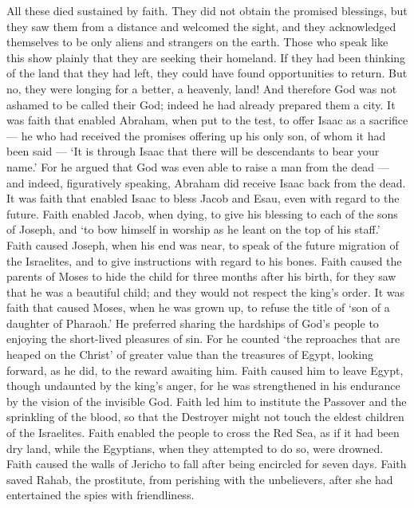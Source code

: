  All these died sustained by faith. They did not obtain the
promised blessings, but they saw them from a distance and welcomed the
sight, and they acknowledged themselves to be only aliens and strangers
on the earth.  Those who speak like this show plainly that
they are seeking their homeland.  If they had been thinking
of the land that they had left, they could have found opportunities to
return.  But no, they were longing for a better, a
heavenly, land! And therefore God was not ashamed to be called their
God; indeed he had already prepared them a city.  It was
faith that enabled Abraham, when put to the test, to offer Isaac as a
sacrifice --- he who had received the promises offering up his only son,
 of whom it had been said --- `It is through Isaac that
there will be descendants to bear your name.'  For he
argued that God was even able to raise a man from the dead --- and
indeed, figuratively speaking, Abraham did receive Isaac back from the
dead.  It was faith that enabled Isaac to bless Jacob and
Esau, even with regard to the future.  Faith enabled Jacob,
when dying, to give his blessing to each of the sons of Joseph, and `to
bow himself in worship as he leant on the top of his staff.'
 Faith caused Joseph, when his end was near, to speak of
the future migration of the Israelites, and to give instructions with
regard to his bones.  Faith caused the parents of Moses to
hide the child for three months after his birth, for they saw that he
was a beautiful child; and they would not respect the king's order.
 It was faith that caused Moses, when he was grown up, to
refuse the title of `son of a daughter of Pharaoh.'  He
preferred sharing the hardships of God's people to enjoying the
short-lived pleasures of sin.  For he counted `the
reproaches that are heaped on the Christ' of greater value than the
treasures of Egypt, looking forward, as he did, to the reward awaiting
him.  Faith caused him to leave Egypt, though undaunted by
the king's anger, for he was strengthened in his endurance by the vision
of the invisible God.  Faith led him to institute the
Passover and the sprinkling of the blood, so that the Destroyer might
not touch the eldest children of the Israelites.  Faith
enabled the people to cross the Red Sea, as if it had been dry land,
while the Egyptians, when they attempted to do so, were drowned.
 Faith caused the walls of Jericho to fall after being
encircled for seven days.  Faith saved Rahab, the
prostitute, from perishing with the unbelievers, after she had
entertained the spies with friendliness.


